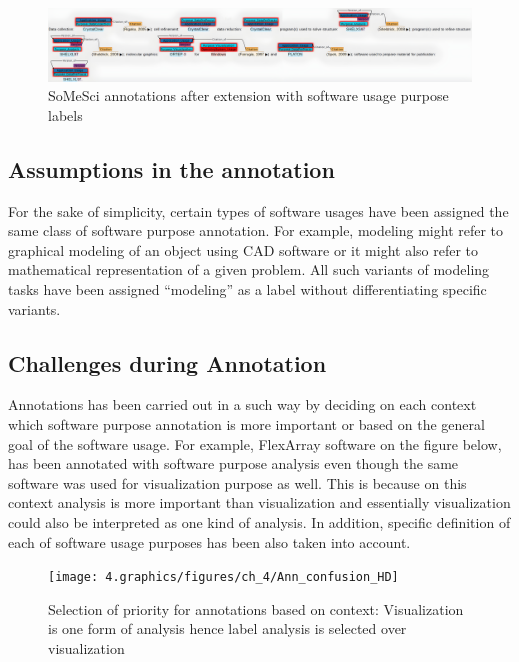 \begin{figure}[htbp]
	\centering
	\includegraphics[width=.99\textwidth]{4.graphics/figures/ch_4/after_ann_hd}
	\caption{\ac{SoMeSci} annotations after extension with software usage purpose labels}
	\label{fig:chapter04:setup}
\end{figure}


\subsection{Assumptions in the annotation}
\label{subsec:dataset:tool:Assumptions}

For the sake of simplicity, certain types of software usages have been assigned the same class of software purpose annotation. For example, modeling might refer to graphical modeling of an object using \ac{CAD} software or it might also refer to mathematical representation of a given problem.  All such variants of modeling tasks have been assigned “modeling” as a label without differentiating specific variants. 



\subsection{Challenges during Annotation }
\label{subsec:dataset:tool:Challenges}
Annotations has been carried out in a such way by deciding on each context which software purpose annotation is more important or based on the general goal of the software usage. For example, FlexArray software on the figure below, has been annotated with software purpose analysis even though the same software was used for visualization purpose as well. This is because on this context analysis is more important than visualization and essentially visualization could also be interpreted as one kind of analysis. In addition, specific definition of each of software usage purposes has been also taken into account. \\

\begin{figure}[htbp]
	\centering
	\texttt{[image: 4.graphics/figures/ch\_4/Ann\_confusion\_HD]}
	\caption{Selection of priority for annotations based on context: Visualization is one form of analysis hence label analysis is selected over visualization }
	\label{fig:chapter04:setup}
\end{figure}

